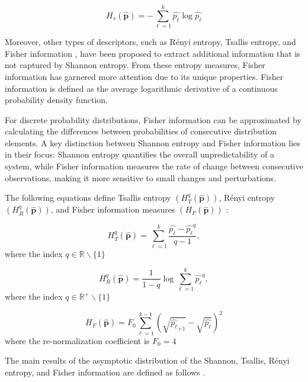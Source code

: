 \begin{equation}
	H_s(\widehat{\bm{p}})=-\sum_{\ell=1}^{k}\widehat{p_\ell} \log\widehat{p_\ell}
\end{equation} 

Moreover, other types of descriptors, such as Rényi entropy\cite{renyi1961measures}, Tsallis entropy\cite{tsallis1988possible}, and Fisher information \cite{frieden2004science}, have been proposed to extract additional information that is not captured by Shannon entropy.
From these entropy measures, Fisher information has garnered more attention due to its unique properties. Fisher information is defined as the average logarithmic derivative of a continuous probability density function.

For discrete probability distributions, Fisher information can be approximated by calculating the differences between probabilities of consecutive distribution elements. A key distinction between Shannon entropy and Fisher information lies in their focus: Shannon entropy quantifies the overall unpredictability of a system, while Fisher information measures the rate of change between consecutive observations, making it more sensitive to small changes and perturbations.

The following equations define Tsallis entropy $	(H_{T}^{q}(\widehat{\bm{p}}))$, Rényi entropy $(H_{R}^{q}(\widehat{\bm{p}}))$, and Fisher information measures $(H_{F}(\widehat{\bm{p}}))$ \cite{sanchez2009discrete} :

\begin{equation}
	H_{T}^{q}(\widehat{\bm{p}})=\sum_{\ell=1}^{k}\dfrac{\widehat{p_\ell}-\widehat{p_\ell}^q}{q-1},
\end{equation}
where the index $q\in \mathbb{R}\backslash \{1\}$

\begin{equation}
	H_{R}^{q}(\widehat{\bm{p}})=\dfrac{1}{1-q} \log \sum_{\ell=1}^{k}{\widehat{p_\ell}}^q,
\end{equation}
where the index $q\in \mathbb{R}^{+}\backslash \{1\}$

\begin{equation}
	H_F(\widehat{\bm{p}})=F_0\sum_{\ell=1}^{k-1}(\sqrt{\widehat{p_\ell}_{+1}}-\sqrt{\widehat{p_\ell}})^2
\end{equation}
where the re-normalization coefficient is $F_0=4$ \cite{sanchez2009discrete}

The main results of the asymptotic distribution of the Shannon, Tsallis, Rényi entropy, and Fisher information are defined as follows \cite{Rey2023}. 

